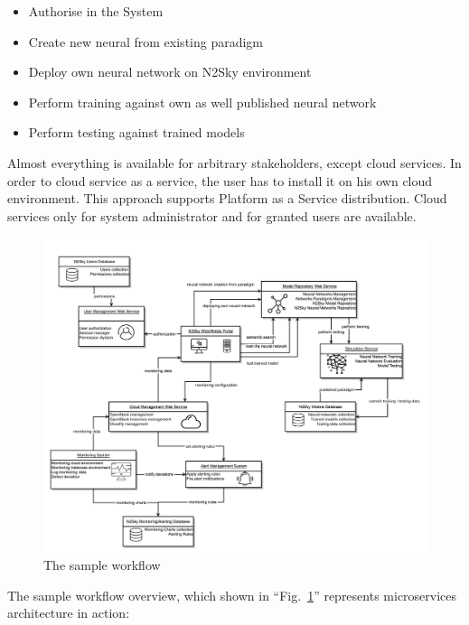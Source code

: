 \begin{itemize}
\item Authorise in the System
\item Create new neural from existing paradigm
\item Deploy own neural network on N2Sky environment 
\item Perform training against own as well published neural network
\item Perform testing against trained models
\end{itemize}

Almost everything is available for arbitrary stakeholders, except cloud services. In order to cloud service as a service, the user has to install it on his own cloud environment. This approach supports Platform as a Service distribution. Cloud services only for system administrator and for granted users are available. 


\begin{figure}[htbp]
\begin{center}
  \includegraphics[width=\linewidth]{components/2/new_arch.png}
  \caption{The sample workflow}
  \label{fig:newarch}
\end{center}
\end{figure}


The sample workflow overview, which shown in ``Fig.~\ref{fig:newarch}'' represents microservices architecture in action:


